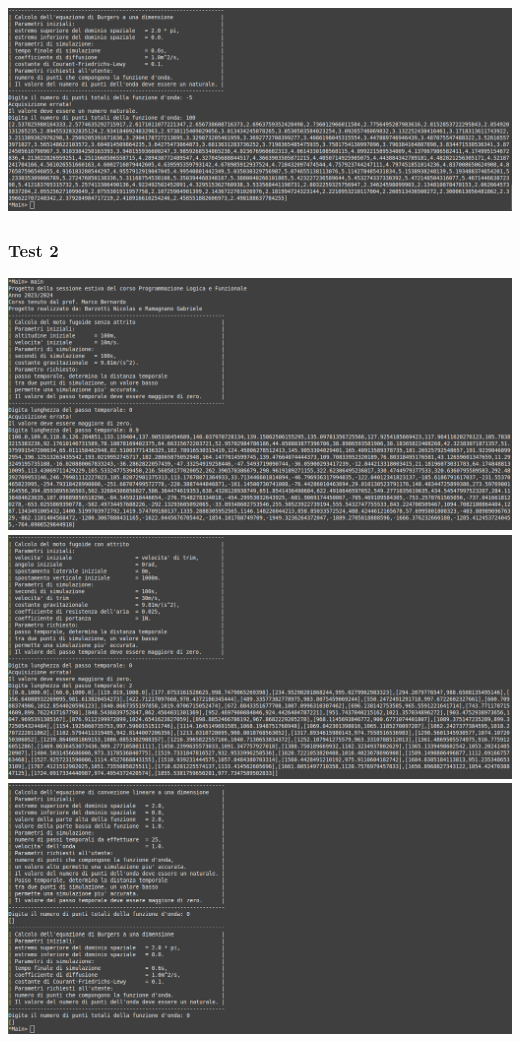\\
\includegraphics[width=\textwidth,height=\textheight,keepaspectratio]{05_testing/image/hs/01_test/04_negativo.png}

\subsubsection*{Test 2}
\includegraphics[width=\textwidth,height=\textheight,keepaspectratio]{05_testing/image/hs/02_test/01_zero.png}
\\
\includegraphics[width=\textwidth,height=\textheight,keepaspectratio]{05_testing/image/hs/02_test/02_zero.png}
\\
\includegraphics[width=\textwidth,height=\textheight,keepaspectratio]{05_testing/image/hs/02_test/03_zero.png}


